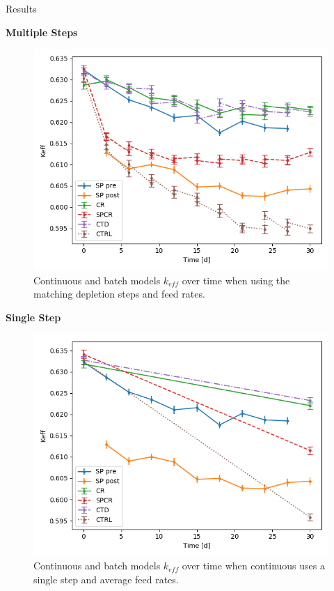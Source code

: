 \documentclass[final]{beamer}
\newlength{\onecolwid}
\newlength{\threecolwid}
\begin{document}
\begin{frame}[t]
\begin{columns}[t,totalwidth=\threecolwid]
\begin{column}{\onecolwid}
\begin{block}{Results}


\textbf{Multiple Steps}
\begin{figure}
	\label{fig:keff_30d_batch}
	\includegraphics[width=0.9\linewidth]{images/cumulative_keff_batch.png}
	\caption{Continuous and batch models $k_{eff}$ over time when using the matching depletion steps and feed rates.}
\end{figure}

\textbf{Single Step}
\begin{figure}
	\label{fig:keff_30d_batch}
	\includegraphics[width=0.9\linewidth]{images/cumulative_keff_coont.png}
	\caption{Continuous and batch models $k_{eff}$ over time when continuous uses a single step and average feed rates.}
\end{figure}


\end{block}
\end{column}
\end{columns}
\end{frame}
\end{document}
